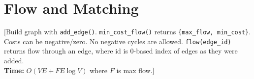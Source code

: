 \chapter{Flow and Matching}




%
[Build graph with \texttt{add\_edge()}. \texttt{min\_cost\_flow()} returns \texttt{\{max\_flow, min\_cost\}}. Costs can be negative/zero. No negative cycles are allowed.
\texttt{flow(edge\_id)} returns flow through an edge, where id is 0-based index of edges as they were added.\\
\textbf{Time:} {$O(VE + F E \log V)$} where $F$ is max flow.]



